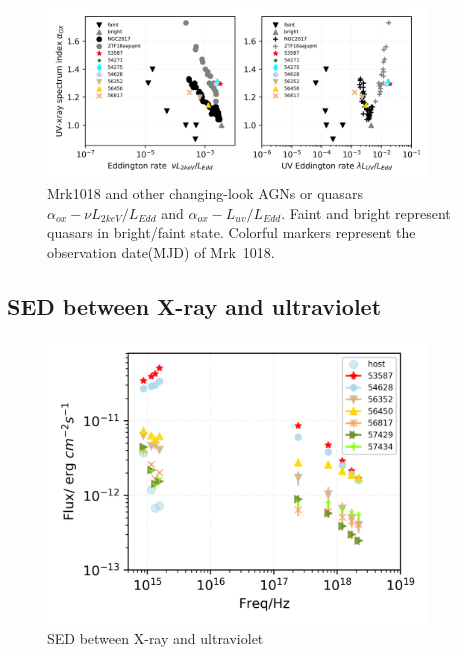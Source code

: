 \documentclass{aastex63}
\begin{document}
\begin{figure}
\centering
	\includegraphics[width=0.9\textwidth]{./pic/Mrk1018_subplots_plus_2individuals_alpha_ox_L_x_Luv_rate.png}
    \caption{Mrk1018 and other changing-look AGNs or quasars $\alpha_{ox}-\nu L_{2keV}/L_{Edd}$ and $\alpha_{ox}-L_{uv}/L_{Edd}$. Faint and bright represent quasars in bright/faint state\citep[see][]{2019ApJ...883...76R}. Colorful markers represent the observation date(MJD) of Mrk~1018.}
    \label{fig:alpha_ox_luv}
\end{figure}



\subsection{SED between X-ray and ultraviolet}\label{subsec:xray-uvot-sed}
\begin{figure}
\centering
	\includegraphics[width=0.9\textwidth]{./pic/Mrk1018_sed_uvot_xray-4band-multi.png}
    \caption{SED between X-ray and ultraviolet}
    \label{fig:xray-uvot-sed}
\end{figure}
\end{document}
